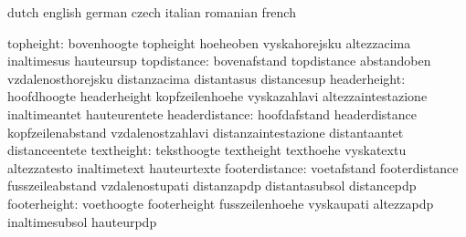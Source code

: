 


\startcommands                    dutch                            english
                                  german                           czech
                                  italian                          romanian
                                  french

                       topheight: bovenhoogte                      topheight
                                  hoeheoben                        vyskahorejsku
                                  altezzacima                      inaltimesus
                                  hauteursup
                     topdistance: bovenafstand                     topdistance
                                  abstandoben                      vzdalenosthorejsku
                                  distanzacima                     distantasus
                                  distancesup
                    headerheight: hoofdhoogte                      headerheight
                                  kopfzeilenhoehe                  vyskazahlavi
                                  altezzaintestazione              inaltimeantet
                                  hauteurentete
                  headerdistance: hoofdafstand                     headerdistance
                                  kopfzeilenabstand                vzdalenostzahlavi
                                  distanzaintestazione             distantaantet
                                  distanceentete
                      textheight: teksthoogte                      textheight
                                  texthoehe                        vyskatextu
                                  altezzatesto                     inaltimetext
                                  hauteurtexte
                  footerdistance: voetafstand                      footerdistance
                                  fusszeileabstand                 vzdalenostupati
                                  distanzapdp                      distantasubsol
                                  distancepdp
                    footerheight: voethoogte                       footerheight
                                  fusszeilenhoehe                  vyskaupati
                                  altezzapdp                       inaltimesubsol
                                  hauteurpdp
